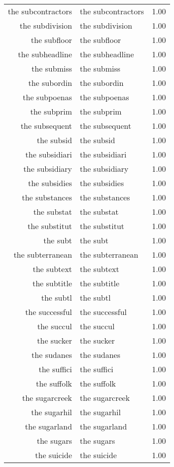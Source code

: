 \begin{table}[ht]
\begin{tabular}{rlr}
  the subcontractors & the subcontractors & 1.00 \\ 
  the subdivision & the subdivision & 1.00 \\ 
  the subfloor & the subfloor & 1.00 \\ 
  the subheadline & the subheadline & 1.00 \\ 
  the submiss & the submiss & 1.00 \\ 
  the subordin & the subordin & 1.00 \\ 
  the subpoenas & the subpoenas & 1.00 \\ 
  the subprim & the subprim & 1.00 \\ 
  the subsequent & the subsequent & 1.00 \\ 
  the subsid & the subsid & 1.00 \\ 
  the subsidiari & the subsidiari & 1.00 \\ 
  the subsidiary & the subsidiary & 1.00 \\ 
  the subsidies & the subsidies & 1.00 \\ 
  the substances & the substances & 1.00 \\ 
  the substat & the substat & 1.00 \\ 
  the substitut & the substitut & 1.00 \\ 
  the subt & the subt & 1.00 \\ 
  the subterranean & the subterranean & 1.00 \\ 
  the subtext & the subtext & 1.00 \\ 
  the subtitle & the subtitle & 1.00 \\ 
  the subtl & the subtl & 1.00 \\ 
  the successful & the successful & 1.00 \\ 
  the succul & the succul & 1.00 \\ 
  the sucker & the sucker & 1.00 \\ 
  the sudanes & the sudanes & 1.00 \\ 
  the suffici & the suffici & 1.00 \\ 
  the suffolk & the suffolk & 1.00 \\ 
  the sugarcreek & the sugarcreek & 1.00 \\ 
  the sugarhil & the sugarhil & 1.00 \\ 
  the sugarland & the sugarland & 1.00 \\ 
  the sugars & the sugars & 1.00 \\ 
  the suicide & the suicide & 1.00 \\ 

\end{tabular}
\end{table}
